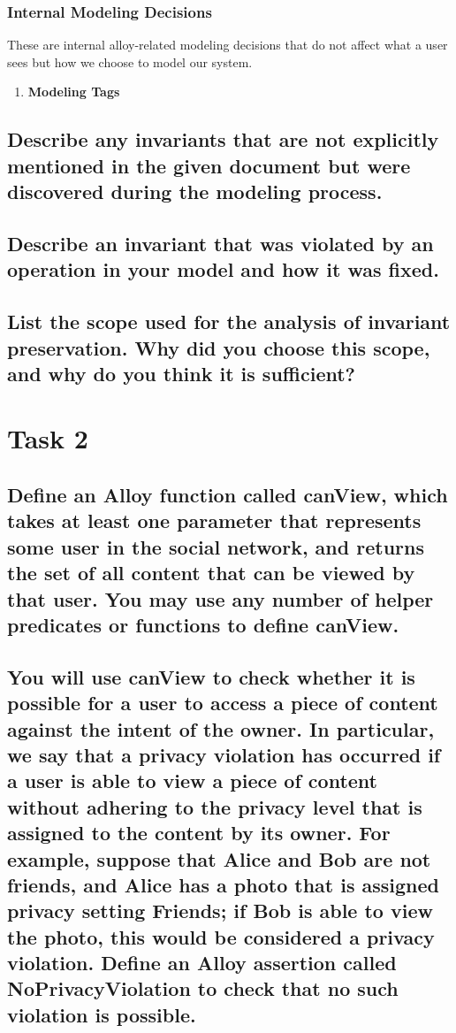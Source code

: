\documentclass[titlepage]{article}
\begin{document}
\subsubsection{Internal Modeling Decisions}
These are internal alloy-related modeling decisions that do not affect what a user sees but how we choose to model our system.
\begin{enumerate}
	\item \textbf{Modeling Tags}
\end{enumerate}

\subsection{Describe any invariants that are not explicitly mentioned in the given document but were discovered during the modeling process.}
\subsection{Describe an invariant that was violated by an operation in your model and how it was fixed.}
\subsection{List the scope used for the analysis of invariant preservation. Why did you choose this scope, and why do you
	think it is sufficient?}

\section{Task 2}
\subsection{Define an Alloy function called canView, which takes at least one parameter that represents some user in the
	social network, and returns the set of all content that can be viewed by that user. You may use any number of
	helper predicates or functions to define canView.}
\subsection{You will use canView to check whether it is possible for a user to access a piece of content against the intent of the owner. In particular, we say that a privacy violation has occurred if a user is able to view a piece of content without adhering to the privacy level that is assigned to the content by its owner. For example, suppose that Alice
	and Bob are not friends, and Alice has a photo that is assigned privacy setting Friends; if Bob is able to view the
	photo, this would be considered a privacy violation. Define an Alloy assertion called NoPrivacyViolation
	to check that no such violation is possible.}
\end{document}

